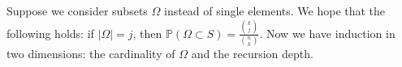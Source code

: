 \documentclass[12pt]{article}
\newcommand{\todo}[1]{{\color{red}{TO DO: \sc #1}}}
\newcommand{\pr}{\mathbb{P}} %
\begin{document}
\noindent Suppose we consider subsets $\Omega$ instead of single elements.
We hope that the following holds: if $| \Omega | = j$, then $\pr( \Omega \subset S) = \frac{{ k \choose j }}{{n \choose k}}$.
Now we have induction in two dimensions: the cardinality of $\Omega$ and the recursion depth.
\todo{prove this.}
%
%
%
%
\end{document}
